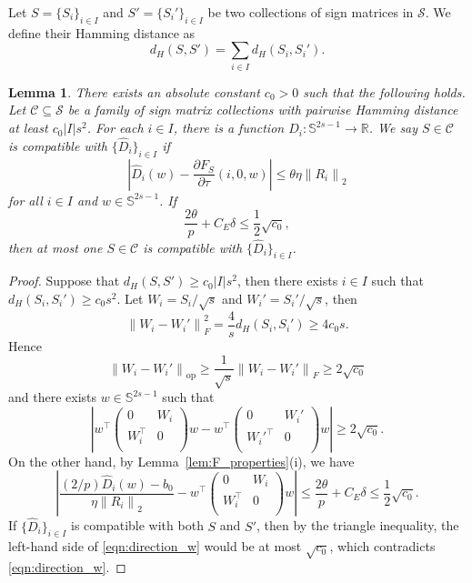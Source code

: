 \documentclass[11pt]{article}
\newtheorem{lemma}[theorem]{Lemma}
\theoremstyle{remark}
\theoremstyle{definition}
\newcommand{\Sph}{\mathbb{S}}
\newcommand{\R}{\mathbb{R}}
\newcommand{\cC}{\mathcal{C}}
\newcommand{\cS}{\mathcal{S}}
\newcommand{\norm}[1]{\left\|#1\right\|}
\newcommand{\op}{\textrm{op}}
\begin{document}
Let $S = \{S_i\}_{i\in I}$ and $S' = \{S_i'\}_{i\in I}$ be two collections of sign matrices in $\cS$. We define their Hamming distance as
\[
	d_H(S,S') = \sum_{i\in I} d_H(S_i, S_i').
\]

\begin{lemma}\label{lem:conditional_recovery}
	There exists an absolute constant $c_0>0$ such that the following holds. Let $\cC \subseteq \cS$ be a family of sign matrix collections with pairwise Hamming distance at least $c_0 |I| s^2$. For each $i\in I$, there is a function $\hat{D}_i:\Sph^{2s-1}\to \R$. We say $S\in\cC$ is \emph{compatible} with $\{\hat{D}_i\}_{i\in I}$ if 	
	\begin{equation}\label{eqn:D_hat}
		\left|\hat{D}_i(w) - \frac{\partial F_S}{\partial \tau}(i,0,w)\right| \leq \theta\eta\norm{R_i}_2
	\end{equation}
	for all $i\in I$ and $w\in\Sph^{2s-1}$. If	
	\begin{equation}\label{eqn:important_condition}
		\frac{2\theta}{p} + C_E\delta \leq \frac{1}{2}\sqrt{c_0},
	\end{equation}
	then at most one $S\in \cC$ is compatible with $\{\hat{D}_i\}_{i\in I}$.
\end{lemma}
\begin{proof}
	Suppose that $d_H(S,S')\geq c_0|I|s^2$, then there exists $i\in I$ such that  $d_H(S_i,S_i')\geq c_0 s^2$. Let $W_i = S_i/\sqrt{s}$ and $W_i' = S_i'/\sqrt{s}$, then
	\[
		\norm{W_i - W_i'}_F^2 = \frac{4}{s}d_H(S_i,S_i') \geq 4 c_0 s.
	\]
	Hence
	\[
		\norm{W_i - W_i'}_{\op}\geq \frac{1}{\sqrt s}\norm{W_i - W_i'}_F \geq 2\sqrt{c_0}
	\]
	and there exists $w\in \Sph^{2s-1}$ such that
	\begin{equation}\label{eqn:direction_w}
		\left|w^\top \begin{pmatrix}
			0 & W_i \\
			W_i^\top & 0 \\
		\end{pmatrix} w - w^\top \begin{pmatrix}
		0 & W_i' \\
		W_i'^\top & 0 \\
	\end{pmatrix} w\right| \geq 2\sqrt{c_0}.
	\end{equation}
	On the other hand, by Lemma~\ref{lem:F_properties}(i), we have
	\[
		\left| \frac{(2/p)\hat{D}_i(w) - b_0}{\eta\norm{R_i}_2} - w^\top \begin{pmatrix}
			0 & W_i \\
			W_i^\top & 0 \\
		\end{pmatrix} w \right| \leq \frac{2\theta}{p} + C_E\delta \leq \frac{1}{2}\sqrt{c_0}.
	\]
	If $\{\hat{D}_i\}_{i\in I}$ is compatible with both $S$ and $S'$, then by the triangle inequality, the left-hand side of \eqref{eqn:direction_w} would be at most $\sqrt{c_0}$, which contradicts \eqref{eqn:direction_w}.	
\end{proof}
\end{document}
